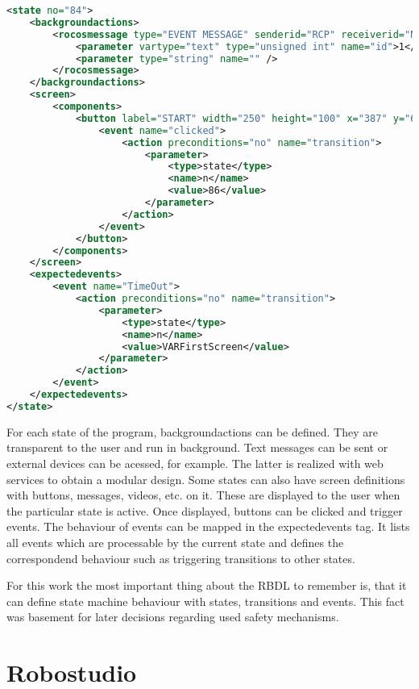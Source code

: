 \begin{lstlisting}[float = htbp, language=XML, captionpos=b, breaklines=true, showspaces=false, showtabs=false, tabsize=2, caption=Example of a state defined by RBDL~\cite{robostudio}., label=lst:RBDL]
<state no="84">
	<backgroundactions>
		<rocosmessage type="EVENT MESSAGE" senderid="RCP" receiverid="NA" name="FDSessionStart">
			<parameter vartype="text" type="unsigned int" name="id">1</parameter>
			<parameter type="string" name="" />
		</rocosmessage>
	</backgroundactions>
	<screen>
		<components>
			<button label="START" width="250" height="100" x="387" y="600" textsize="40">
				<event name="clicked">
					<action preconditions="no" name="transition">
						<parameter>
							<type>state</type>
							<name>n</name>
							<value>86</value>
						</parameter>
					</action>
				</event>
			</button>
		</components>
	</screen>
	<expectedevents>
		<event name="TimeOut">
			<action preconditions="no" name="transition">
				<parameter>
					<type>state</type>
					<name>n</name>
					<value>VARFirstScreen</value>
				</parameter>
			</action>
		</event>
	</expectedevents>
</state>
\end{lstlisting}

For each state of the program, backgroundactions can be defined. They are transparent to the user and run in background. Text messages can be sent or external devices can be acessed, for example. The latter is realized with web services to obtain a modular design.
Some states can also have screen definitions with buttons, messages, videos, etc. on it. These are displayed to the user when the particular state is active. Once displayed, buttons can be clicked and trigger events.
The behaviour of events can be mapped in the expectedevents tag. It lists all events which are processable by the current state and defines the correspondend behaviour such as triggering transitions to other states.

For this work the most important thing about the RBDL to remember is, that it can define state machine behaviour with states, transitions and events. This fact was basement for later decisions regarding used safety mechanisms.







\section{Robostudio}
\label{sec:robostudio}

